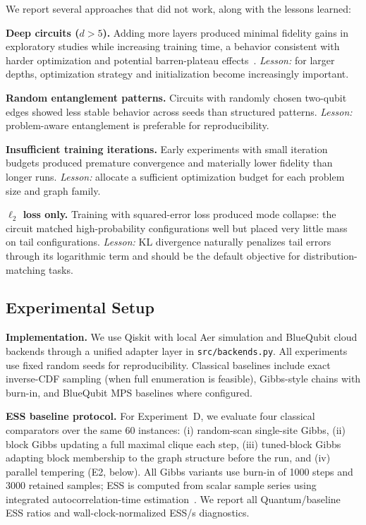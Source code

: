 \documentclass[conference,10pt]{IEEEtran}
\begin{document}
We report several approaches that did not work, along with the lessons learned:

\textbf{Deep circuits ($d > 5$).} Adding more layers produced minimal fidelity gains in exploratory studies while increasing training time, a behavior consistent with harder optimization and potential barren-plateau effects~\cite{mcclean2018barren}. \emph{Lesson:} for larger depths, optimization strategy and initialization become increasingly important.

\textbf{Random entanglement patterns.} Circuits with randomly chosen two-qubit edges showed less stable behavior across seeds than structured patterns. \emph{Lesson:} problem-aware entanglement is preferable for reproducibility.

\textbf{Insufficient training iterations.} Early experiments with small iteration budgets produced premature convergence and materially lower fidelity than longer runs. \emph{Lesson:} allocate a sufficient optimization budget for each problem size and graph family.

\textbf{$\ell_2$ loss only.} Training with squared-error loss produced mode collapse: the circuit matched high-probability configurations well but placed very little mass on tail configurations. \emph{Lesson:} KL divergence naturally penalizes tail errors through its logarithmic term and should be the default objective for distribution-matching tasks.

\subsection{Experimental Setup}
\label{sec:setup}

\textbf{Implementation.} We use Qiskit with local Aer simulation and BlueQubit cloud backends through a unified adapter layer in \texttt{src/backends.py}. All experiments use fixed random seeds for reproducibility. Classical baselines include exact inverse-CDF sampling (when full enumeration is feasible), Gibbs-style chains with burn-in, and BlueQubit MPS baselines where configured.

\textbf{ESS baseline protocol.} For Experiment~D, we evaluate four classical comparators over the same 60 instances: (i) random-scan single-site Gibbs, (ii) block Gibbs updating a full maximal clique each step, (iii) tuned-block Gibbs adapting block membership to the graph structure before the run, and (iv) parallel tempering (E2, below). All Gibbs variants use burn-in of 1000 steps and 3000 retained samples; ESS is computed from scalar sample series using integrated autocorrelation-time estimation~\cite{geyer1992practical}. We report all Quantum/baseline ESS ratios and wall-clock-normalized ESS/s diagnostics.
\end{document}
